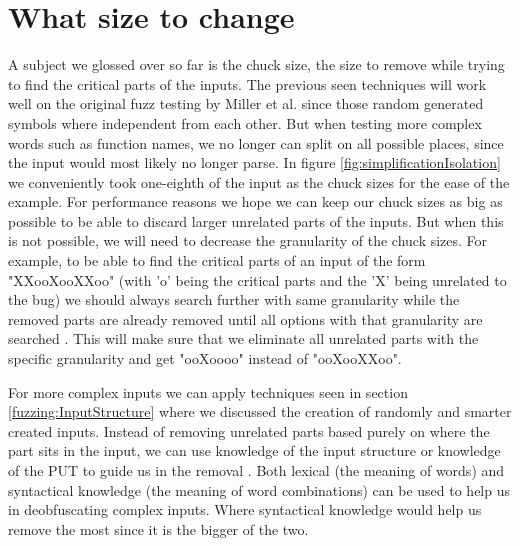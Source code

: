 \section{What size to change}
\label{inputReduction:Chucksize}
A subject we glossed over so far is the chuck size, the size to remove while trying to find the critical parts of the inputs. 
The previous seen techniques will work well on the original fuzz testing by Miller et al. \cite{4originalFuzzingUnixUtils} since those random generated symbols where independent from each other. But when testing more complex words such as function names, we no longer can split on all possible places, since the input would most likely no longer parse. 
In figure \ref{fig:simplificationIsolation} we conveniently took one-eighth of the input as the chuck sizes for the ease of the example. For performance reasons we hope we can keep our chuck sizes as big as possible to be able to discard larger unrelated parts of the inputs. But when this is not possible, we will need to decrease the granularity of the chuck sizes.
For example, to be able to find the critical parts of an input of the form "XXooXooXXoo" (with 'o' being the critical parts and the 'X' being unrelated to the bug) we should always search further with same granularity while the removed parts are already removed until all options with that granularity are searched \cite{bookZellerwhyProgramsFail}. This will make sure that we eliminate all unrelated parts with the specific granularity and get "ooXoooo" instead of "ooXooXXoo". 

For more complex inputs we can apply techniques seen in section \ref{fuzzing:InputStructure} where we discussed the creation of randomly and smarter created inputs. Instead of removing unrelated parts based purely on where the part sits in the input, we can use knowledge of the input structure or knowledge of the PUT to guide us in the removal \cite{bookZellerwhyProgramsFail}. Both lexical (the meaning of words) and syntactical knowledge (the meaning of word combinations) can be used to help us in deobfuscating complex inputs. Where syntactical knowledge would help us remove the most since it is the bigger of the two.

